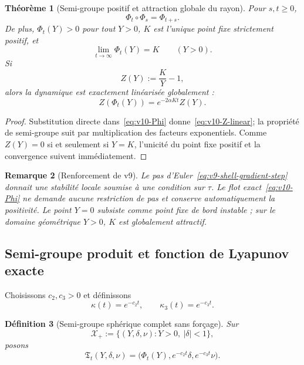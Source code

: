\documentclass[11pt,a4paper]{article}
\newtheorem{theorem}{Théorème}[section]
\newtheorem{definition}[theorem]{Définition}
\newtheorem{remark}[theorem]{Remarque}
\begin{document}
\begin{theorem}[Semi-groupe positif et attraction globale du rayon]\label{thm:v10-radial-global}
Pour $s,t\ge0$,
\begin{equation}\label{eq:v10-Phi-semigroup}
 \Phi_t\circ\Phi_s=\Phi_{t+s}.
\end{equation}
De plus, $\Phi_t(Y)>0$ pour tout $Y>0$, $K$ est l'unique point fixe strictement positif, et
\[
 \lim_{t\to\infty}\Phi_t(Y)=K
 \qquad(Y>0).
\]
Si
\begin{equation}\label{eq:v10-Z}
 Z(Y):=\frac{K}{Y}-1,
\end{equation}
alors la dynamique est exactement linéarisée globalement :
\begin{equation}\label{eq:v10-Z-linear}
 \boxed{Z(\Phi_t(Y))=e^{-2\alpha Kt}Z(Y).}
\end{equation}
\end{theorem}

\begin{proof}
Substitution directe dans~\eqref{eq:v10-Phi} donne~\eqref{eq:v10-Z-linear}; la propriété de semi-groupe suit par multiplication des facteurs exponentiels. Comme $Z(Y)=0$ si et seulement si $Y=K$, l'unicité du point fixe positif et la convergence suivent immédiatement.
\end{proof}

\begin{remark}[Renforcement de v9]
Le pas d'Euler~\eqref{eq:v9-shell-gradient-step} donnait une stabilité locale soumise à une condition sur $\tau$. Le flot exact~\eqref{eq:v10-Phi} ne demande aucune restriction de pas et conserve automatiquement la positivité. Le point $Y=0$ subsiste comme point fixe de bord instable ; sur le domaine géométrique $Y>0$, $K$ est globalement attractif.
\end{remark}

\subsection{Semi-groupe produit et fonction de Lyapunov exacte}

Choisissons $c_2,c_3>0$ et définissons
\begin{equation}\label{eq:v10-kappas}
 \kappa(t)=e^{-c_2t},\qquad
 \kappa_3(t)=e^{-c_3t}.
\end{equation}

\begin{definition}[Semi-groupe sphérique complet sans forçage]\label{def:v10-product-flow}
Sur
\[
 \mathcal X_+:=\{(Y,\delta,\nu):Y>0,\ |\delta|<1\},
\]
posons
\begin{equation}\label{eq:v10-product-flow}
 \boxed{
 \mathfrak T_t(Y,\delta,\nu)
 =\bigl(\Phi_t(Y),e^{-c_2t}\delta,e^{-c_3t}\nu\bigr).}
\end{equation}
\end{definition}
\end{document}
